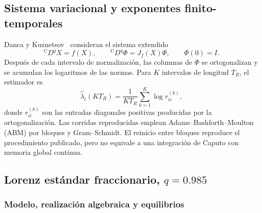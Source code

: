 \subsection{Sistema variacional y exponentes finito-temporales}

Danca y Kuznetsov~\cite{DancaKuznetsov2018Lyapunov} consideran el sistema
extendido
\begin{equation}
 {}^{\mathrm C}D^q X=f(X),\qquad
 {}^{\mathrm C}D^q\Phi=J_f(X)\Phi,\qquad \Phi(0)=I.
 \label{ncbench:eq:variational}
\end{equation}
Después de cada intervalo de normalización, las columnas de \(\Phi\) se
ortogonalizan y se acumulan los logaritmos de las normas. Para \(K\) intervalos
de longitud \(T_R\), el estimador es
\begin{equation}
 \widehat\lambda_i(KT_R)=\frac{1}{KT_R}
 \sum_{k=1}^{K}\log r_{ii}^{(k)},
 \label{ncbench:eq:benettin}
\end{equation}
donde \(r_{ii}^{(k)}\) son las entradas diagonales positivas producidas por la
ortogonalización. Las corridas reproducidas emplean Adams--Bashforth--Moulton
(ABM) por bloques y Gram--Schmidt. El reinicio entre bloques reproduce el
procedimiento publicado, pero no equivale a una integración de Caputo con
memoria global continua.

\subsection{Lorenz estándar fraccionario, \texorpdfstring{\(q=0.985\)}{q=0.985}}

\subsubsection*{Modelo, realización algebraica y equilibrios}

